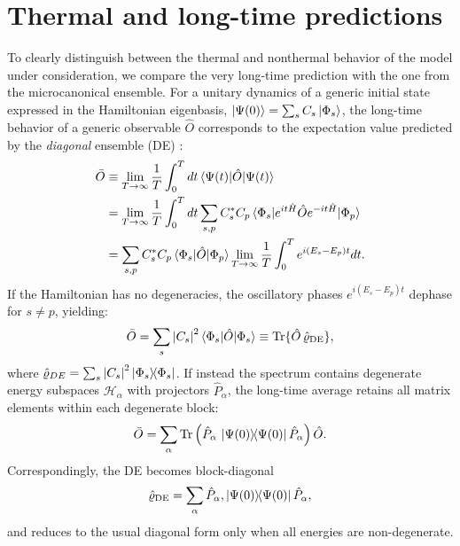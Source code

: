 \documentclass[aps,prl,reprint,twocolumn,superscriptaddress,floatfix,nofootinbib]{revtex4-2}
\begin{document}
\section{Thermal and long-time predictions}
\label{app_ensembles}
To clearly distinguish between the thermal and nonthermal behavior of the model under consideration, we compare the very long-time prediction with the one from the microcanonical ensemble.
For a unitary dynamics of a generic initial state expressed in the Hamiltonian eigenbasis, $\ket{\Psi(0)}=\sum_{s}C_{s}\ket{\Phi_{s}}$, the long-time behavior of a generic observable $\hat{O}$ corresponds to the expectation value predicted by the \emph{diagonal} ensemble (DE) \cite{Rigol2008ThermalizationItsMechanism}:
\begin{equation}
    \begin{split}
        \bar{O} & \equiv\lim_{T\to\infty} \frac{1}{T}\int_0^T dt \braket{\Psi(t)|\hat O|\Psi(t)}                                           \\
                & =\lim_{T\to\infty} \frac{1}{T}\int_0^T dt
        \sum_{s,p} C^{*}_{s}C_{p}\braket{\Phi_{s}|e^{it\hat{H}}\hat Oe^{-it\hat{H}}|\Phi_{p}}                                              \\
                & =\sum_{s,p} C^{*}_{s}C_{p}\braket{\Phi_{s}|\hat O|\Phi_{p}}\lim_{T\to\infty} \frac{1}{T}\int_0^T e^{i(E_{s}-E_{p})t} dt.
    \end{split}
    \label{eq_DE}
\end{equation}
If the Hamiltonian has no degeneracies, the oscillatory phases $e^{i(E_s-E_p)t}$ dephase for $s\neq p$, yielding:
\begin{equation}
    \bar{O}=\sum_{s}\abs{C_{s}}^2 \braket{\Phi_s|\hat O|\Phi_s}
    \equiv \Tr\{\hat O\, \hat{\varrho}_{\rm DE}\},
    \label{eq_nondegenerate_DE}
\end{equation}
where $\hat{\varrho}_{DE}=\sum_{s}\abs{C_s}^2 \ketbra{\Phi_s}$.
If instead the spectrum contains degenerate energy subspaces $\mathcal{H}_\alpha$ with projectors $\hat P_\alpha$, the long-time average retains all matrix elements within each degenerate block:
\begin{equation}
    \bar{O}=\sum_{\alpha}\Tr\left(\hat{P}_{\alpha}\, \ketbra{\Psi(0)}{\Psi(0)}\hat{P}_\alpha\right)\hat{O}.
    \label{eq_degenerate_DE}
\end{equation}
Correspondingly, the DE becomes block-diagonal
\begin{equation}
    \hat{\varrho}_{\rm DE}=\sum_{\alpha}\hat{P}_{\alpha}, \ketbra{\Psi(0)}{\Psi(0)}\hat{P}_{\alpha},
\end{equation}
and reduces to the usual diagonal form only when all energies are non-degenerate.
\end{document}
